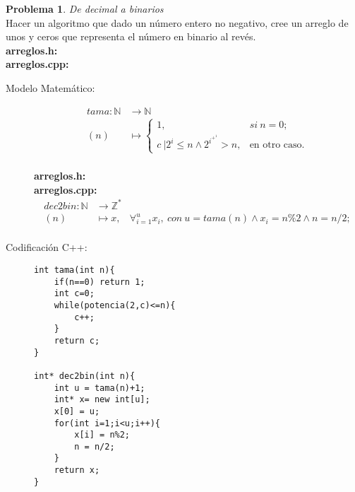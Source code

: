 \documentclass{article}
\theoremstyle{plain}
\theoremstyle{definition}
\newtheorem{problem}{Problema}
\begin{document}
\begin{problem} \emph{De decimal a binarios}\\
Hacer un algoritmo que dado un número entero no negativo, cree un arreglo de unos y ceros que representa el número en binario al revés.\\
\textbf{arreglos.h:}\ \\
\textbf{arreglos.cpp:}\ 
%
\begin{description}
\item[Modelo Matemático:]
%
\begin{align*}
tama: \mathbb{N} &\to \mathbb{N}\\
(n) &\mapsto
\begin{cases}
1,& si\ n=0;\\
c\ |2^i \leq n \wedge 2^i^+^1 > n,&  \text{en otro caso.}
\end{cases}
\end{align*}\\
\textbf{arreglos.h:}\ \\
\textbf{arreglos.cpp:}\ \\
\begin{align*}
dec2bin: \mathbb{N} &\to \mathbb{Z}^*\\
(n) &\mapsto x,& \forall_{i=1}^u x_i,\ con\ u = tama(n) \wedge x_i= n\%2 \wedge n = n/2;\\
\end{align*}
%
\item[Codificación \textsf{C++}:]\hfill
%
\begin{verbatim}
int tama(int n){
    if(n==0) return 1;
    int c=0;
    while(potencia(2,c)<=n){
        c++;
    }
    return c;
}

int* dec2bin(int n){
    int u = tama(n)+1;
    int* x= new int[u];
    x[0] = u;
    for(int i=1;i<u;i++){
        x[i] = n%2;
        n = n/2;
    }
    return x;
}
\end{verbatim}
\end{description}
\end{problem}
\end{document}
